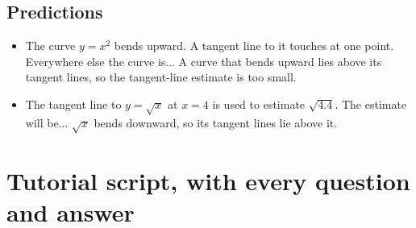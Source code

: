 \documentclass[11pt]{article}
\begin{document}
\subsection*{Predictions}\begin{itemize}
\item The curve $y=x^2$ bends upward. A tangent line to it touches at one point. Everywhere else the curve is...  A curve that bends upward lies above its tangent lines, so the tangent-line estimate is too small.
\item The tangent line to $y=\sqrt{x}$ at $x=4$ is used to estimate $\sqrt{4.4}$. The estimate will be...  $\sqrt{x}$ bends downward, so its tangent lines lie above it.
\end{itemize}
\section*{Tutorial script, with every question and answer}
\end{document}
